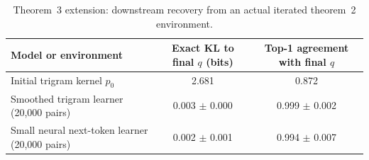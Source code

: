 \begin{table}[t]
\centering
\footnotesize
\caption{Theorem~3 extension: downstream recovery from an actual iterated theorem~2 environment.}
\label{tab:appx-theorem3-iterated-extension}
\begin{tabular}{lcc}
\toprule
Model or environment & Exact KL to final $q$ (bits) & Top-1 agreement with final $q$ \\
\midrule
Initial trigram kernel $p_0$ & 2.681 & 0.872 \\
Smoothed trigram learner (20,000 pairs) & 0.003 $\pm$ 0.000 & 0.999 $\pm$ 0.002 \\
Small neural next-token learner (20,000 pairs) & 0.002 $\pm$ 0.001 & 0.994 $\pm$ 0.007 \\
\bottomrule
\end{tabular}
\end{table}
